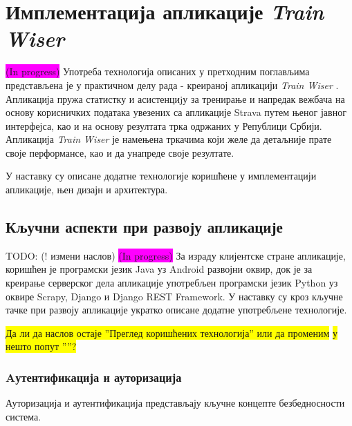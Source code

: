 \documentclass[12pt,oneside]{memoir}
\begin{document}
\chapter{Имплементација апликације \textit{Train Wiser}}

\colorbox{magenta}{(In progress)} Употреба технологија описаних у претходним поглављима представљена је у практичном делу рада - креираној апликацији \textit{Train Wiser} \cite{train_wiser_implementation}. Апликација пружа статистку и асистенциjу за тренирање и напредак вежбача на основу корисничких података увезених са апликације Strava путем њеног јавног интерфејса, као и на основу резултата трка одржаних у Републици Србији. %
Апликација \textit{Train Wiser} је намењена тркачима који желе да детаљније прате своје перформансе, као и да унапреде своје резултате. %

У наставку су описане додатне технологије коришћене у имплементацији апликације, њен дизајн и архитектура.




\section{Кључни аспекти при развоју апликације}

TODO: (! измени наслов)
\colorbox{magenta}{(In progress)} За израду клијентске стране апликације, коришћен је програмски језик Java уз Android развојни оквир, док је за креирање серверског дела апликације употребљен програмски језик Python уз оквире Scrapy,  %
Django и Django REST Framework. У наставку су кроз кључне тачке при развоју апликације укратко
описане додатне употребљене технологије.

\colorbox{yellow}{Да ли да наслов остаје ''Преглед коришћених технологија'' 
или да променим} 
\colorbox{yellow}{у нешто попут ''''?}

\subsection{Aутентификација и ауторизација} \label{subsec:authorization_and_authentication}

Ауторизација и аутентификација представљају кључне концепте безбедносности система.
\end{document}
